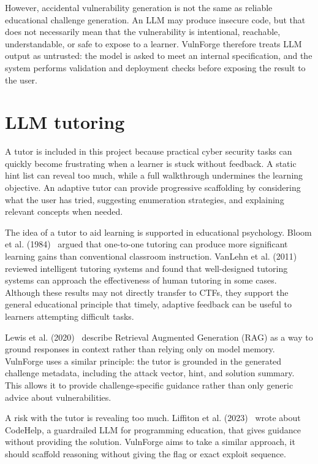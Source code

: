 However, accidental vulnerability generation is not the same as reliable educational challenge generation. An LLM may produce insecure code, but that does not necessarily mean that the vulnerability is intentional, reachable, understandable, or safe to expose to a learner. VulnForge therefore treats LLM output as untrusted: the model is asked to meet an internal specification, and the system performs validation and deployment checks before exposing the result to the user.

\section{LLM tutoring}\label{sec:llm-tutoring}
A tutor is included in this project because practical cyber security tasks can quickly become frustrating when a learner is stuck without feedback. A static hint list can reveal too much, while a full walkthrough undermines the learning objective. An adaptive tutor can provide progressive scaffolding by considering what the user has tried, suggesting enumeration strategies, and explaining relevant concepts when needed.

The idea of a tutor to aid learning is supported in educational psychology. Bloom et al. (1984)~\citep{bloom_2_1984} argued that one-to-one tutoring can produce more significant learning gains than conventional classroom instruction. VanLehn et al. (2011)~\citep{vanlehn_relative_2011} reviewed intelligent tutoring systems and found that well-designed tutoring systems can approach the effectiveness of human tutoring in some cases. Although these results may not directly transfer to CTFs, they support the general educational principle that timely, adaptive feedback can be useful to learners attempting difficult tasks.

Lewis et al. (2020)~\citep{lewis_retrieval-augmented_2021} describe Retrieval Augmented Generation (RAG) as a way to ground responses in context rather than relying only on model memory. VulnForge uses a similar principle: the tutor is grounded in the generated challenge metadata, including the attack vector, hint, and solution summary. This allows it to provide challenge-specific guidance rather than only generic advice about vulnerabilities.

A risk with the tutor is revealing too much. Liffiton et al. (2023)~\citep{liffiton_codehelp_2024} wrote about CodeHelp, a guardrailed LLM for programming education, that gives guidance without providing the solution. VulnForge aims to take a similar approach, it should scaffold reasoning without giving the flag or exact exploit sequence.

